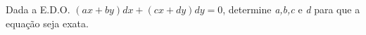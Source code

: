 \linespread{1.5}
Dada a E.D.O. $(ax+by)dx + (cx+dy)dy = 0$, determine \textit{a,b,c} e \textit{d} para que a equação seja exata.

